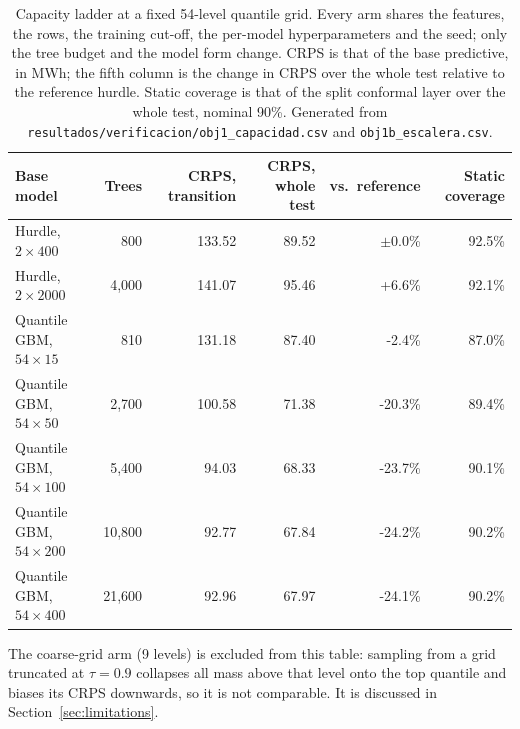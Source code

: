 \begin{table}[t]
\centering
\footnotesize
\caption{Capacity ladder at a fixed 54-level quantile grid. Every arm shares the features, the rows, the training cut-off, the per-model hyperparameters and the seed; only the tree budget and the model form change. CRPS is that of the base predictive, in MWh; the fifth column is the change in CRPS over the whole test relative to the reference hurdle. Static coverage is that of the split conformal layer over the whole test, nominal 90\%. Generated from \texttt{resultados/verificacion/obj1\_capacidad.csv} and \texttt{obj1b\_escalera.csv}.}
\label{tab:escalera}
\begin{tabular}{lrrrrr}
\toprule
Base model & Trees & CRPS, transition & CRPS, whole test & vs.\ reference & Static coverage \\
\midrule
Hurdle, $2\times400$ & 800 & 133.52 & 89.52 & $\pm$0.0\% & 92.5\% \\
Hurdle, $2\times2000$ & 4{,}000 & 141.07 & 95.46 & +6.6\% & 92.1\% \\
Quantile GBM, $54\times15$ & 810 & 131.18 & 87.40 & -2.4\% & 87.0\% \\
Quantile GBM, $54\times50$ & 2{,}700 & 100.58 & 71.38 & -20.3\% & 89.4\% \\
Quantile GBM, $54\times100$ & 5{,}400 & 94.03 & 68.33 & -23.7\% & 90.1\% \\
Quantile GBM, $54\times200$ & 10{,}800 & 92.77 & 67.84 & -24.2\% & 90.2\% \\
Quantile GBM, $54\times400$ & 21{,}600 & 92.96 & 67.97 & -24.1\% & 90.2\% \\
\bottomrule
\end{tabular}

\vspace{3pt}
\parbox{\linewidth}{\footnotesize The coarse-grid arm (9 levels) is excluded from this table: sampling from a grid truncated at $\tau=0.9$ collapses all mass above that level onto the top quantile and biases its CRPS downwards, so it is not comparable. It is discussed in Section~\ref{sec:limitations}.}
\end{table}
